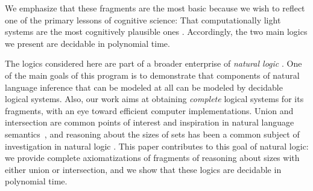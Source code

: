 \documentclass[letterpaper]{article} %
\theoremstyle{definition}
\begin{document}
We emphasize that these fragments are the most basic because we wish to reflect one of the primary lessons of cognitive science:  That computationally light systems are the most cognitively plausible ones \cite{reasoning_about_sizes_of_sets}.
Accordingly, the two main logics we present are decidable in polynomial time.

The logics considered here are part of a broader enterprise of \emph{natural logic} \cite{Moss2015,reasoning_about_sizes_of_sets,vanBenthemHistory08}.  One of the main goals of this program is to demonstrate that components of natural language inference that can be modeled at all can be modeled by decidable logical systems.
Also, our work aims at obtaining \emph{complete} logical systems for
its fragments, with an eye toward efficient computer implementations.
Union and intersection are common points of interest and inspiration in natural language semantics~\cite{KeenanFaltz}, and reasoning about the sizes of sets has been a common subject of investigation in natural logic \cite{reasoning_about_sizes_of_sets,pratt_hartmann_2008}.
This paper contributes to this goal of natural logic: we provide complete axiomatizations of fragments of reasoning about sizes with either union or intersection, and we show that these logics are decidable in polynomial time.
\end{document}
